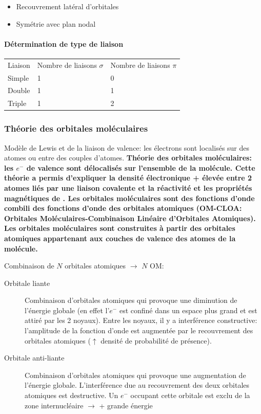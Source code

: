 \documentclass[11pt,a4paper,french]{article}
\renewcommand{\textbf}[1]{\begingroup\bfseries\mathversion{bold}#1\endgroup}
\begin{document}
\begin{itemize}
	\item Recouvrement latéral d'orbitales
	\item Symétrie avec plan nodal
\end{itemize}

\paragraph{Détermination de type de liaison}

\begin{center}
	\begin{tabular}{lll}
		Liaison & Nombre de liaisons $\sigma$ & Nombre de liaisons $\pi$\\
		Simple & 1 & 0\\ %
		Double & 1 & 1\\
		Triple & 1 & 2\\
	\end{tabular}
\end{center}

\subsubsection{Théorie des orbitales moléculaires}
Modèle de Lewis et de la liaison de valence: les électrons sont localisés sur des atomes ou entre des couples d'atomes.
\textbf{Théorie des orbitales moléculaires:} les $e^-$ de valence sont délocalisés sur l'ensemble de la molécule.
Cette théorie a permis d'expliquer la densité électronique + élevée entre 2 atomes liés par une liaison covalente et la réactivité et les propriétés magnétiques de .
Les \textbf{orbitales moléculaires} sont des fonctions d'onde combili des fonctions d'onde des orbitales atomiques (OM-CLOA: Orbitales Moléculaires-Combinaison Linéaire d'Orbitales Atomiques).
Les orbitales moléculaires sont construites à partir des orbitales atomiques appartenant aux couches de valence des atomes de la molécule.

Combinaison de $N$ orbitales atomiques $\rightarrow$ $N$ OM:
\begin{description}
	\item[Orbitale liante] Combinaison d'orbitales atomiques qui provoque une diminution de l'énergie globale (en effet l'$e^-$ est confiné dans un espace plus grand et est attiré par les 2 noyaux).
		Entre les noyaux, il y a interférence constructive: l'amplitude de la fonction d'onde est augmentée par le recouvrement des orbitales atomiques ($\uparrow$ densité de probabilité de présence).

	\item[Orbitale anti-liante] Combinaison d'orbitales atomiques qui provoque une augmentation de l'énergie globale.
		L'interférence due au recouvrement des deux orbitales atomiques est destructive.
		Un $e^-$ occupant cette orbitale est exclu de la zone internucléaire $\rightarrow$ + grande énergie
\end{description}
\end{document}
